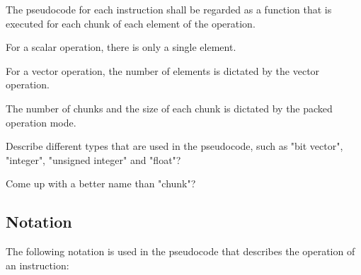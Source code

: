 The pseudocode for each instruction shall be regarded as a function that is
executed for each chunk of each element of the operation.

For a scalar operation, there is only a single element.

For a vector operation, the number of elements is dictated by the vector
operation.

The number of chunks and the size of each chunk is dictated by the packed
operation mode.

\begin{todobox}
Describe different types that are used in the pseudocode, such as
"bit vector", "integer", "unsigned integer" and "float"?

Come up with a better name than "chunk"?
\end{todobox}

\subsection{Notation}

The following notation is used in the pseudocode that describes the operation
of an instruction:

